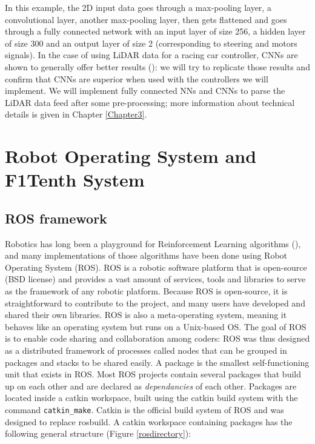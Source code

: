 In this example, the 2D input data goes through a max-pooling layer, a convolutional layer, another max-pooling layer, then gets flattened and goes through a fully connected network with an input layer of size 256, a hidden layer of size 300 and an output layer of size 2 (corresponding to steering and motors signals). \newline
In the case of using LiDAR data for a racing car controller, CNNs are shown to generally offer better results (\cite{bosello}): we will try to replicate those results and confirm that CNNs are superior when used with the controllers we will implement. We will implement fully connected NNs and CNNs to parse the LiDAR data feed after some pre-processing; more information about technical details is given in Chapter \ref{Chapter3}.

\section{Robot Operating System and F1Tenth System}
\label{rosandf1tenth}
\subsection{ROS framework}

Robotics has long been a playground for Reinforcement Learning algorithms (\cite{rlintro}), and many implementations of those algorithms have been done using Robot Operating System (ROS). ROS is a robotic software platform that is open-source (BSD license) and provides a vast amount of services, tools and libraries to serve as the framework of any robotic platform. Because ROS is open-source, it is straightforward to contribute to the project, and many users have developed and shared their own libraries. ROS is also a meta-operating system, meaning it behaves like an operating system but runs on a Unix-based OS. The goal of ROS is to enable code sharing and collaboration among coders: ROS was thus designed as a distributed framework of processes called nodes that can be grouped in packages and stacks to be shared easily. A package is the smallest self-functioning unit that exists in ROS. Most ROS projects contain several packages that build up on each other and are declared as \textit{dependancies} of each other. Packages are located inside a catkin workspace, built using the catkin build system with the command \verb |catkin_make|. Catkin is the official build system of ROS and was designed to replace rosbuild. A catkin workspace containing packages has the following general structure (Figure \ref{rosdirectory}):

